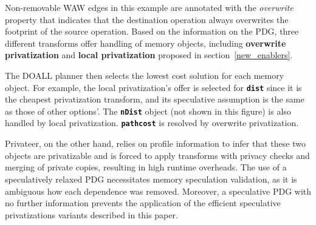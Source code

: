 Non-removable WAW edges in this example are annotated with
the \textit{overwrite} property that indicates that the destination
operation always overwrites the footprint of the source operation.
%
Based on the information on the PDG, three different transforms offer
handling of memory objects, including \textbf{overwrite privatization} and
\textbf{local privatization} proposed in
section~\cref{new_enablers}.

%
%
The DOALL planner then selects the lowest cost solution for each memory
object. For example, the local privatization's
offer is selected for \texttt{\textbf{dist}} since it is the cheapest
privatization transform, and its
speculative assumption is the same as those of other options'.
The \texttt{\textbf{nDist}} object (not shown in this figure) is also handled
by local privatization. \texttt{\textbf{pathcost}} is resolved by overwrite
privatization.



%
Privateer, on the other hand, relies on profile information to infer
that these two objects are privatizable and is forced to apply
transforms with privacy checks and merging of private copies,
resulting in high runtime overheads. The use of a speculatively
relaxed PDG necessitates memory speculation validation, as it is
ambiguous how each dependence was removed.  Moreover, a speculative
PDG with no further information prevents the application of the
efficient speculative privatizations variants described in this paper.

%





